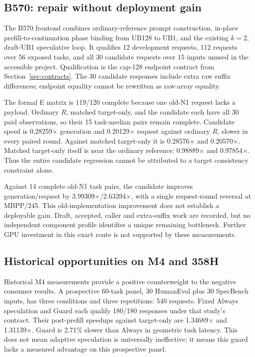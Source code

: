 \documentclass{article}
\begin{document}
\subsection{B570: repair without deployment gain}
The B570 frontend combines ordinary-reference prompt construction, in-place prefill-to-continuation phase binding from UB128 to UB1, and the existing $k=2$, draft-UB1 speculative loop. It qualifies 12 development requests, 112 requests over 56 exposed tasks, and all 30 candidate requests over 15 inputs unused in the accessible project. Qualification is the cap-128 endpoint contract from Section~\ref{sec:contracts}. The 30 candidate responses include extra raw suffix differences; endpoint equality cannot be rewritten as raw-array equality.

The formal E matrix is 119/120 complete because one old-N1 request lacks a payload. Ordinary $R$, matched target-only, and the candidate each have all 30 paid observations, so their 15 task-median pairs remain complete. Candidate speed is 0.28259$\times$ generation and 0.20129$\times$ request against ordinary $R$, slower in every paired round. Against matched target-only it is 0.28576$\times$ and 0.20570$\times$. Matched target-only itself is near the ordinary reference: 0.98889$\times$ and 0.97854$\times$. Thus the entire candidate regression cannot be attributed to a target consistency constraint alone.

Against 14 complete old-N1 task pairs, the candidate improves generation/request by 3.99309$\times$/2.63394$\times$, with a single request-round reversal at MBPP/245. This old-implementation improvement does not establish a deployable gain. Draft, accepted, caller and extra-suffix work are recorded, but no independent component profile identifies a unique remaining bottleneck. Further GPU investment in this exact route is not supported by these measurements.

\subsection{Historical opportunities on M4 and 358H}
Historical M4 measurements provide a positive counterweight to the negative consumer results. A prospective 60-task panel, 30 HumanEval plus 30 SpecBench inputs, has three conditions and three repetitions: 540 requests. Fixed Always speculation and Guard each qualify 180/180 responses under that study's contract. Their post-prefill speedups against target-only are 1.34689$\times$ and 1.31139$\times$. Guard is 2.71\% slower than Always in geometric task latency. This does not mean adaptive speculation is universally ineffective; it means this guard lacks a measured advantage on this prospective panel.
\end{document}

